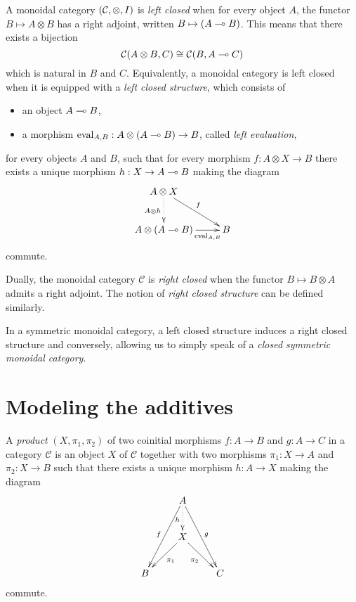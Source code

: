 \begin{definition}\label{smcc}
A monoidal category $(\mathcal{C},\otimes,I)$ is \emph{left closed} when for every object $A$, the functor $B\mapsto A\otimes B$ has a right adjoint, written $B\mapsto(A\multimap B)$.
This means that there exists a bijection
\begin{equation*}
\mathcal{C}(A\otimes B, C) \cong \mathcal{C}(B,A\multimap C)
\end{equation*}
which is natural in $B$ and $C$.
Equivalently, a monoidal category is left closed when it is equipped with a \emph{left closed structure}, which consists of
\begin{itemize}
\item an object $A\multimap B$,
\item a morphism $\mathrm{eval}_{A,B}:A\otimes (A\multimap B)\to B$, called \emph{left evaluation},
\end{itemize}
for every objects $A$ and $B$, such that for every morphism $f:A\otimes X\to B$ there exists a unique morphism $h:X\to A\multimap B$ making the diagram
\begin{equation*}
\xymatrix{
A\tens X\ar@{.>}[d]_{A\tens h}\ar[dr]^{f}\\
A\tens(A\limp B)\ar[r]_-{\mathrm{eval}_{A,B}}& B
}
\end{equation*}
commute.

Dually, the monoidal category $\mathcal{C}$ is \emph{right closed} when the functor $B\mapsto B\otimes A$ admits a right adjoint. The notion of \emph{right closed structure} can be defined similarly.
\end{definition}

In a symmetric monoidal category, a left closed structure induces a
right closed structure and conversely, allowing us to simply speak of a
\emph{closed symmetric monoidal category}.

\section{Modeling the additives}\label{modeling-the-additives}

\begin{definition}[Product]\label{cartesianproduct}
A \emph{product} $(X,\pi_1,\pi_2)$ of two coinitial morphisms $f:A\to B$ and $g:A\to C$ in a category $\mathcal{C}$ is an object $X$ of $\mathcal{C}$ together with two morphisms $\pi_1:X\to A$ and $\pi_2:X\to B$ such that there exists a unique morphism $h:A\to X$ making the diagram
\begin{equation*}
\xymatrix{
& \ar[ddl]_fA\ar@{.>}[d]_h\ar[ddr]^g& \\
& \ar[dl]^{\pi_1}X\ar[dr]_{\pi_2}& \\
B& & C
}
\end{equation*}
commute.
\end{definition}

